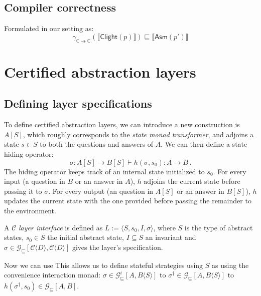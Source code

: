 \documentclass[format=sigplan,authordraft]{acmart}
\newcommand{\gcat}{\mathcal{G}_{\sqsubseteq}}
\newcommand{\kw}[1]{\ensuremath{\mathsf{#1}}}
\begin{document}

\subsection{Compiler correctness} %

Formulated in our setting as:
\[
    \gamma_{\mathbb{C} \twoheadrightarrow \mathbb{C}}
          (\llbracket \kw{Clight}(p) \rrbracket) \sqsubseteq
    \llbracket \kw{Asm}(p') \rrbracket
\]



\section{Certified abstraction layers} %

\subsection{Defining layer specifications} %

To define certified abstraction layers,
we can introduce a new construction is $A[S]$,
which roughly corresponds to the \emph{state monad transformer},
and adjoins a state $s \in S$ to both the questions and answers of $A$.
We can then define a state hiding operator:
\[
    \sigma : A[S] \rightarrow B[S] \vdash
    h(\sigma, s_0) : A \rightarrow B \,.
\]
The hiding operator keeps track of an internal state
initialized to $s_0$.
For every input (a question in $B$ or an answer in $A$),
$h$ adjoins the current state before passing it to $\sigma$.
For every output (an question in $A[S]$ or an answer in $B[S]$),
$h$ updates the current state with the one provided
before passing the remainder to the environment.

A $\mathcal{C}$ \emph{layer interface} is defined as
$L := \langle S, s_0, I, \sigma \rangle$,
where $S$ is the type of abstract states,
$s_0 \in S$ the initial abstract state,
$I \subseteq S$ an invariant and
$\sigma \in
 \gcat[\mathcal{C}\langle D \rangle, \mathcal{C}\langle D \rangle]$
gives the layer's specification.



Now we can use 
This allows us to define stateful strategies
using $S$ as 
using the convenience interaction monad:
$\sigma \in \gcat^i[A, B \langle S \rangle]$
to $\sigma^\dagger \in \gcat[A, B \langle S \rangle]$
to $h(\sigma^\dagger, s_0) \in \gcat[A, B]$.

\end{document}
